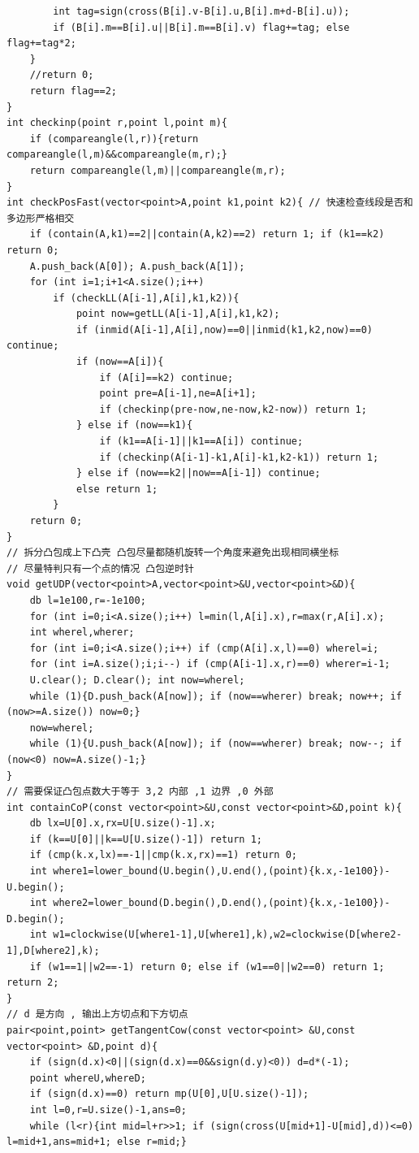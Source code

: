 \documentclass[twoside]{article}
\begin{document}
\begin{lstlisting}
        int tag=sign(cross(B[i].v-B[i].u,B[i].m+d-B[i].u));
        if (B[i].m==B[i].u||B[i].m==B[i].v) flag+=tag; else flag+=tag*2;
    }
    //return 0;
    return flag==2;
}
int checkinp(point r,point l,point m){
	if (compareangle(l,r)){return compareangle(l,m)&&compareangle(m,r);}
	return compareangle(l,m)||compareangle(m,r);
}
int checkPosFast(vector<point>A,point k1,point k2){ // 快速检查线段是否和多边形严格相交
	if (contain(A,k1)==2||contain(A,k2)==2) return 1; if (k1==k2) return 0;
	A.push_back(A[0]); A.push_back(A[1]);
	for (int i=1;i+1<A.size();i++)
		if (checkLL(A[i-1],A[i],k1,k2)){
			point now=getLL(A[i-1],A[i],k1,k2);
			if (inmid(A[i-1],A[i],now)==0||inmid(k1,k2,now)==0) continue;
			if (now==A[i]){
				if (A[i]==k2) continue;
				point pre=A[i-1],ne=A[i+1];
				if (checkinp(pre-now,ne-now,k2-now)) return 1;
			} else if (now==k1){
				if (k1==A[i-1]||k1==A[i]) continue;
				if (checkinp(A[i-1]-k1,A[i]-k1,k2-k1)) return 1;
			} else if (now==k2||now==A[i-1]) continue;
			else return 1;
		}
	return 0;
}
// 拆分凸包成上下凸壳 凸包尽量都随机旋转一个角度来避免出现相同横坐标 
// 尽量特判只有一个点的情况 凸包逆时针
void getUDP(vector<point>A,vector<point>&U,vector<point>&D){
    db l=1e100,r=-1e100;
    for (int i=0;i<A.size();i++) l=min(l,A[i].x),r=max(r,A[i].x);
    int wherel,wherer;
    for (int i=0;i<A.size();i++) if (cmp(A[i].x,l)==0) wherel=i;
    for (int i=A.size();i;i--) if (cmp(A[i-1].x,r)==0) wherer=i-1;
    U.clear(); D.clear(); int now=wherel;
    while (1){D.push_back(A[now]); if (now==wherer) break; now++; if (now>=A.size()) now=0;}
    now=wherel;
    while (1){U.push_back(A[now]); if (now==wherer) break; now--; if (now<0) now=A.size()-1;}
}
// 需要保证凸包点数大于等于 3,2 内部 ,1 边界 ,0 外部
int containCoP(const vector<point>&U,const vector<point>&D,point k){
    db lx=U[0].x,rx=U[U.size()-1].x;
    if (k==U[0]||k==U[U.size()-1]) return 1;
    if (cmp(k.x,lx)==-1||cmp(k.x,rx)==1) return 0;
    int where1=lower_bound(U.begin(),U.end(),(point){k.x,-1e100})-U.begin();
    int where2=lower_bound(D.begin(),D.end(),(point){k.x,-1e100})-D.begin();
    int w1=clockwise(U[where1-1],U[where1],k),w2=clockwise(D[where2-1],D[where2],k);
    if (w1==1||w2==-1) return 0; else if (w1==0||w2==0) return 1; return 2;
}
// d 是方向 , 输出上方切点和下方切点
pair<point,point> getTangentCow(const vector<point> &U,const vector<point> &D,point d){
    if (sign(d.x)<0||(sign(d.x)==0&&sign(d.y)<0)) d=d*(-1);
    point whereU,whereD;
    if (sign(d.x)==0) return mp(U[0],U[U.size()-1]);
    int l=0,r=U.size()-1,ans=0;
    while (l<r){int mid=l+r>>1; if (sign(cross(U[mid+1]-U[mid],d))<=0) l=mid+1,ans=mid+1; else r=mid;}

\end{lstlisting}
\end{document}
